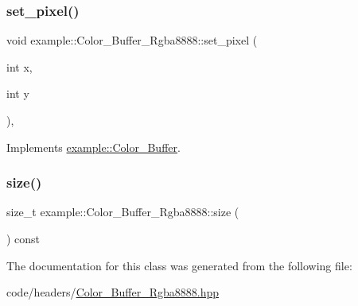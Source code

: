 \mbox{\label{classexample_1_1_color___buffer___rgba8888_aceb94fbc6797177c5a401f4d10d56766}} 
\subsubsection{\texorpdfstring{set\_pixel()}{set\_pixel()}\hspace{0.1cm}{\footnotesize\ttfamily [2/2]}}
{\footnotesize\ttfamily void example\+::\+Color\+\_\+\+Buffer\+\_\+\+Rgba8888\+::set\+\_\+pixel (\begin{DoxyParamCaption}\item[{int}]{x,  }\item[{int}]{y }\end{DoxyParamCaption})\hspace{0.3cm}{\ttfamily [inline]}, {\ttfamily [virtual]}}



Implements \mbox{\hyperlink{classexample_1_1_color___buffer_a967ea326ec0889a36db523727a8154b5}{example\+::\+Color\+\_\+\+Buffer}}.

\mbox{\label{classexample_1_1_color___buffer___rgba8888_a635f30dda6b8e1851b444ff6e0d2a092}} 
\subsubsection{\texorpdfstring{size()}{size()}}
{\footnotesize\ttfamily size\+\_\+t example\+::\+Color\+\_\+\+Buffer\+\_\+\+Rgba8888\+::size (\begin{DoxyParamCaption}{ }\end{DoxyParamCaption}) const\hspace{0.3cm}{\ttfamily [inline]}}



The documentation for this class was generated from the following file\+:\begin{DoxyCompactItemize}
\item 
code/headers/\mbox{\hyperlink{_color___buffer___rgba8888_8hpp}{Color\+\_\+\+Buffer\+\_\+\+Rgba8888.\+hpp}}\end{DoxyCompactItemize}
